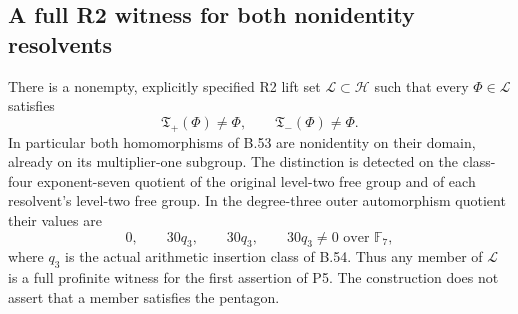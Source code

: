 \subsection*{A full R2 witness for both nonidentity resolvents}

There is a nonempty, explicitly specified R2 lift set
$\mathscr L\subset\mathcal H$ such that every $\Phi\in\mathscr L$
satisfies
\[
       \mathfrak T_+(\Phi)\ne\Phi,
       \qquad \mathfrak T_-(\Phi)\ne\Phi.                  \tag{B.55.1}
\]
In particular both homomorphisms of B.53 are nonidentity on
their domain, already on its multiplier-one subgroup.
The distinction is detected on the class-four exponent-seven
quotient of the original level-two free group and of each
resolvent's level-two free group. In the degree-three outer
automorphism quotient their values are
\[
             0,\qquad 30q_3,\qquad30q_3,
                     \qquad30q_3\ne0\text{ over }\mathbb F_7,
                                                               \tag{B.55.2}
\]
where $q_3$ is the actual arithmetic insertion class of B.54.
Thus any member of $\mathscr L$ is a full profinite witness
for the first assertion of P5. The construction does not
assert that a member satisfies the pentagon.

